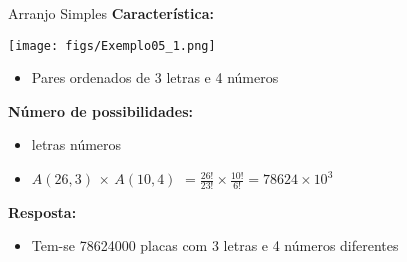 \documentclass[aspectratio=169]{beamer}
\begin{document}
\begin{frame}{Arranjo Simples}
    \textbf{Característica:}
    \vspace{2mm}

    \begin{multicols}{2}
        \begin{center}
            \texttt{[image: figs/Exemplo05\_1.png]}
        \end{center}
        
        \pause
        \columnbreak

        \begin{itemize}
            \item Pares ordenados de 3 letras e 4 números
        \end{itemize}
    \end{multicols}

    \vspace{2mm}
    \pause
    \textbf{Número de possibilidades:}
    
    
        \begin{itemize}
            \item[] \hspace{1mm} letras \hspace{10mm} números \pause
            \item[] $A(26,3)$ \hspace{2.5mm} \pause $\times$ \hspace{2mm} $A(10,4)$  \pause $= \frac{26!}{23!} \times \frac{10!}{6!} = 78624 \times 10^3$
        \end{itemize}

    \pause
    \textbf{Resposta:}

    \vspace{2mm}

    \begin{itemize}
        \item Tem-se 78624000 placas com 3 letras e 4 números diferentes
    \end{itemize}

    
\end{frame}
\end{document}
